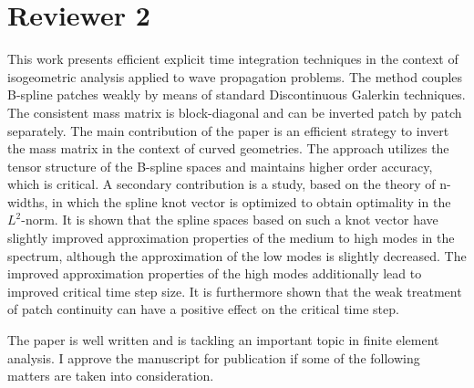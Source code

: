 \documentclass[10pt]{article}
\begin{document}
\section{Reviewer 2}

This work presents efficient explicit time integration techniques in the context of isogeometric analysis applied to wave propagation problems. The method couples B-spline patches weakly by means of standard Discontinuous Galerkin techniques. The consistent mass matrix is block-diagonal and can be inverted patch by patch separately. The main contribution of the paper is an efficient strategy to invert the mass matrix in the context of curved geometries. The approach utilizes the tensor structure of the B-spline spaces and maintains higher order accuracy, which is critical. A secondary contribution is a study, based on the theory of n-widths, in which the spline knot vector is optimized to obtain optimality in the $L^2$-norm. It is shown that the spline spaces based on such a knot vector have slightly improved approximation properties of the medium to high modes in the spectrum, although the approximation of the low modes is slightly decreased. The improved approximation
properties of the high modes additionally lead to improved critical time step size. It is furthermore shown that the weak treatment of patch continuity can have a positive effect on the critical time step.

The paper is well written and is tackling an important topic in finite element analysis. I approve the manuscript for publication if some of the following matters are taken into consideration.
\end{document}
